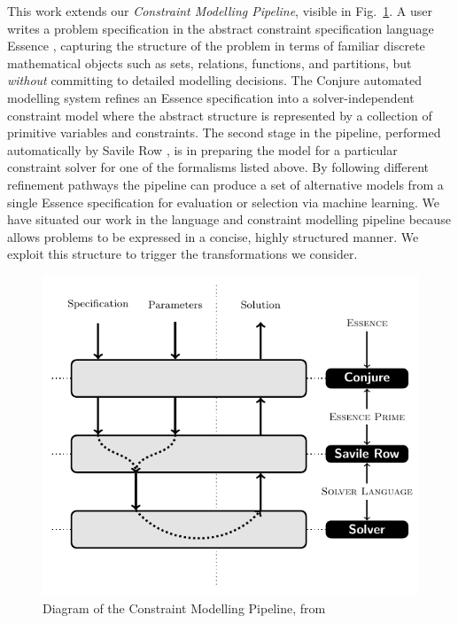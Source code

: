 \documentclass[runningheads]{llncs}
\begin{document}
This work extends our {\em Constraint Modelling Pipeline}, visible in Fig.~\ref{fig:toolchain}. A user writes a problem specification in the abstract constraint specification language {\sc Essence} \cite{frisch2008:essence}, capturing the structure of the problem in terms of familiar discrete mathematical objects such as sets, relations, functions, and partitions, but {\em without} committing to detailed modelling decisions. The {\sc Conjure} \cite{Akgun2022:Conjure} automated modelling system refines an {\sc Essence} specification into a solver-independent constraint model where the abstract structure is represented by a collection of primitive variables and constraints. The second stage in the pipeline, performed automatically by {\sc Savile Row} \cite{savilerow}, is in preparing the model for a particular constraint solver for one of the formalisms listed above. By following different refinement pathways the pipeline can produce a set of alternative models from a single {\sc Essence} specification for evaluation or selection via machine learning. We have situated our work in the \essence language and constraint modelling pipeline because \essence allows problems to be expressed in a concise, highly structured manner. We exploit this structure to trigger the transformations we consider. 

\begin{figure}[ht]
\centering
  \includegraphics[width=0.80\columnwidth]{toolchain.pdf}
  \caption{Diagram of the Constraint Modelling Pipeline, from~\cite{Akgun2022:Conjure}}
    \label{fig:toolchain}
\end{figure}
\end{document}
